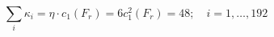 \begin{equation}
\textstyle{\sum_{i}} \kappa_{i} = \eta \cdot c_{1}(F_{r}) = 6
c^{2}_{1}(F_{r}) = 48;
\quad i=1,\ldots,192
\end{equation} 

